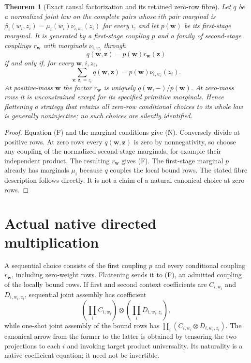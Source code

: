 \documentclass[11pt]{article}
\newtheorem{theorem}{Theorem}\newtheorem{proposition}[theorem]{Proposition}
\begin{document}
\begin{theorem}[Exact causal factorization and its retained zero-row fibre]
Let $q$ be a normalized joint law on the complete pairs whose $i$th pair marginal is $\beta_i(w_i,z_i)=\mu_i(w_i)\nu_{i,w_i}(z_i)$ for every $i$, and let $p(\mathbf w)$ be its first-stage marginal. It is generated by a first-stage coupling $p$ and a family of second-stage couplings $r_{\mathbf w}$ with marginals $\nu_{i,w_i}$ through
\[
 q(\mathbf w,\mathbf z)=p(\mathbf w)r_{\mathbf w}(\mathbf z) \tag{F}
\]
if and only if, for every $\mathbf w,i,z_i$,
\[
 \sum_{\mathbf z:\,\mathbf z_i=z_i}q(\mathbf w,\mathbf z)
 =p(\mathbf w)\nu_{i,w_i}(z_i).\tag{N}
\]
At positive-mass $\mathbf w$ the factor $r_{\mathbf w}$ is uniquely $q(\mathbf w,-)/p(\mathbf w)$. At zero-mass rows it is unconstrained except for its specified primitive marginals. Hence flattening a strategy that retains all zero-row conditional choices to its whole law is generally noninjective; no such choices are silently identified.
\end{theorem}
\begin{proof}
Equation (F) and the marginal conditions give (N). Conversely divide at positive rows. At zero rows every $q(\mathbf w,\mathbf z)$ is zero by nonnegativity, so choose any coupling of the normalized second-stage marginals, for example their independent product. The resulting $r_{\mathbf w}$ gives (F). The first-stage marginal $p$ already has marginals $\mu_i$ because $q$ couples the local bound rows. The stated fibre description follows directly. It is not a claim of a natural canonical choice at zero rows.
\end{proof}

\section{Actual native directed multiplication}
A sequential choice consists of the first coupling $p$ and every conditional coupling $r_{\mathbf w}$, including zero-weight rows. Flattening sends it to (F), an admitted coupling of the locally bound rows. If first and second context coefficients are $C_{i,w_i}$ and $D_{i,w_i,z_i}$, sequential joint assembly has coefficient
\[
 (\prod_i C_{i,w_i})\otimes(\prod_i D_{i,w_i,z_i}),
\]
while one-shot joint assembly of the bound rows has $\prod_i(C_{i,w_i}\otimes D_{i,w_i,z_i})$. The canonical arrow from the former to the latter is obtained by tensoring the two projections to each $i$ and invoking target product universality. Its naturality is a native coefficient equation; it need not be invertible.
\end{document}
